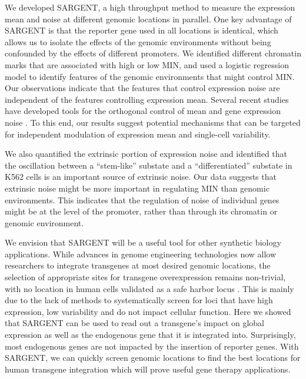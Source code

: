 We developed SARGENT, a high throughput method to measure the expression mean and noise at different genomic locations in parallel. One key advantage of SARGENT is that the reporter gene used in all locations is identical, which allows us to isolate the effects of the genomic environments without being confounded by the effects of different promoters. We identified different chromatin marks that are associated with high or low MIN, and used a logistic regression model to identify features of the genomic environments that might control MIN. Our observations indicate that the features that control expression noise are independent of the features controlling expression mean. Several recent studies have developed tools for the orthogonal control of mean and gene expression noise \cite{bonnyar_el-samadh:OrthogonalControl2021,benzingerd_khammashm:PulsatileInputs2018, michaelsys_fulgata:PreciseTuning2019}. To this end, our results suggest potential mechanisms that can be targeted for independent modulation of expression mean and single-cell variability. 

We also quantified the extrinsic portion of expression noise and identified that the oscillation between a \enquote{stem-like} substate and a \enquote{differentiated} substate in K562 cells is an important source of extrinsic noise. Our data suggests that extrinsic noise might be more important in regulating MIN than genomic environments. This indicates that the regulation of noise of individual genes might be at the level of the promoter, rather than through its chromatin or genomic environment.
 
We envision that SARGENT will be a useful tool for other synthetic biology applications. While advances in genome engineering technologies now allow researchers to integrate transgenes at most desired genomic locations, the selection of appropriate sites for transgene overexpression remains non-trivial, with no location in human cells validated as a safe harbor locus \cite{papapetrouep_schambacha:GeneInsertion2016,pavanig_amendolam:TargetedGene2021}. This is mainly due to the lack of methods to systematically screen for loci that have high expression, low variability and do not impact cellular function. Here we showed that SARGENT can be used to read out a transgene’s impact on global expression as well as the endogenous gene that it is integrated into. Surprisingly, most endogenous genes are not impacted by the insertion of reporter genes. With SARGENT, we can quickly screen genomic locations to find the best locations for human transgene integration which will prove useful gene therapy applications.

